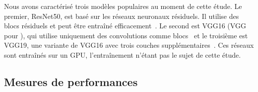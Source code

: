 \begin{table}[t]
\caption{Workload characterization }
\centering
{}%
\label{table:herofake-tasks}
\end{table}

Nous avons caractérisé trois modèles populaires au moment de cette étude. Le premier, ResNet50, est basé sur les réseaux neuronaux résiduels. Il utilise des blocs résiduels et peut être entraîné efficacement~\cite{NEURIPS2019_7716d0fc}. Le second est VGG16 (VGG pour ), qui utilise uniquement des convolutions comme blocs~\cite{DBLP:journals/corr/SimonyanZ14a} et le troisième est VGG19, une variante de VGG16 avec trois couches supplémentaires~\cite{biom10070984}. Ces réseaux sont entraînés sur un GPU, l'entraînement n'étant pas le sujet de cette étude.

\subsection{Mesures de performances}

